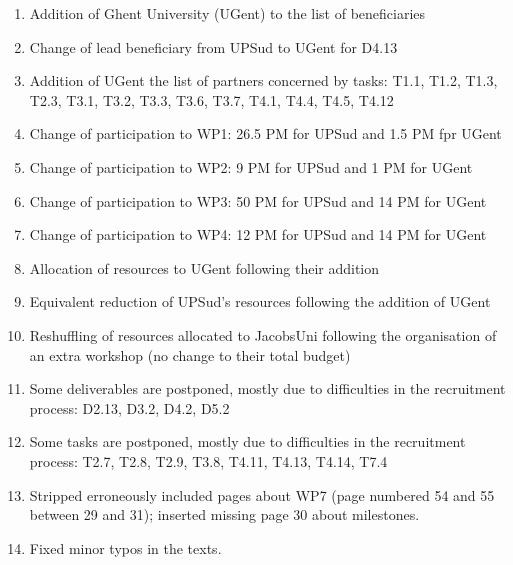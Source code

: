 \begin{enumerate}
\item Addition of Ghent University (UGent) to the list of beneficiaries
\item Change of lead beneficiary from UPSud to UGent for D4.13
\item Addition of UGent the list of partners concerned by tasks: T1.1, T1.2, T1.3, T2.3, T3.1, T3.2, T3.3, T3.6, T3.7, T4.1, T4.4, T4.5, T4.12
\item Change of participation to WP1: 26.5 PM for UPSud and 1.5 PM fpr UGent
\item Change of participation to WP2: 9 PM for UPSud and 1 PM for UGent
\item Change of participation to WP3: 50 PM for UPSud and 14 PM for UGent
\item Change of participation to WP4: 12 PM for UPSud and 14 PM for UGent
\item Allocation of resources to UGent following their addition
\item Equivalent reduction of UPSud's resources following the addition of UGent
\item Reshuffling of resources allocated to JacobsUni following the
  organisation of an extra workshop (no change to their total budget)
\item Some deliverables are postponed, mostly due to difficulties in the recruitment process: D2.13, D3.2, D4.2, D5.2
\item Some tasks are postponed, mostly due to difficulties in the recruitment process: T2.7, T2.8, T2.9, T3.8, T4.11, T4.13, T4.14, T7.4
\item Stripped erroneously included pages about WP7 (page numbered 54
  and 55 between 29 and 31); inserted missing page 30 about
  milestones.
\item Fixed minor typos in the texts.
\end{enumerate}
\clearpage
\thispagestyle{empty}
